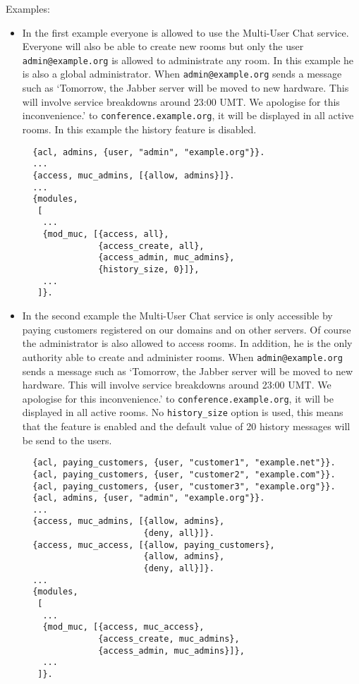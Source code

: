 \documentclass[a4paper,10pt]{book}
\newcommand{\jid}[1]{\texttt{#1}}
\newcommand{\term}[1]{\texttt{#1}}
\newcommand{\Jabber}{Jabber}
\begin{document}
Examples:
\begin{itemize}
\item In the first example everyone is allowed to use the Multi-User Chat
  service. Everyone will also be able to create new rooms but only the user
  \jid{admin@example.org} is allowed to administrate any room. In this
  example he is also a global administrator. When \jid{admin@example.org}
  sends a message such as `Tomorrow, the \Jabber{} server will be moved
  to new hardware. This will involve service breakdowns around 23:00 UMT.
  We apologise for this inconvenience.' to \jid{conference.example.org},
  it will be displayed in all active rooms. In this example the history
  feature is disabled.
  \begin{verbatim}
  {acl, admins, {user, "admin", "example.org"}}.
  ...
  {access, muc_admins, [{allow, admins}]}.
  ...
  {modules,
   [
    ...
    {mod_muc, [{access, all},
               {access_create, all},
               {access_admin, muc_admins},
               {history_size, 0}]},
    ...
   ]}.
\end{verbatim}
\item In the second example the Multi-User Chat service is only accessible by
  paying customers registered on our domains and on other servers. Of course
  the administrator is also allowed to access rooms. In addition, he is the
  only authority able to create and administer rooms. When
  \jid{admin@example.org} sends a message such as `Tomorrow, the \Jabber{}
  server will be moved to new hardware. This will involve service breakdowns
  around 23:00 UMT. We apologise for this inconvenience.' to
  \jid{conference.example.org}, it will be displayed in all active rooms. No
  \term{history\_size} option is used, this means that the feature is enabled
  and the default value of 20 history messages will be send to the users.
  \begin{verbatim}
  {acl, paying_customers, {user, "customer1", "example.net"}}.
  {acl, paying_customers, {user, "customer2", "example.com"}}.
  {acl, paying_customers, {user, "customer3", "example.org"}}.
  {acl, admins, {user, "admin", "example.org"}}.
  ...
  {access, muc_admins, [{allow, admins},
                        {deny, all}]}.
  {access, muc_access, [{allow, paying_customers},
                        {allow, admins},
                        {deny, all}]}.
  ...
  {modules,
   [
    ...
    {mod_muc, [{access, muc_access},
               {access_create, muc_admins},
               {access_admin, muc_admins}]},
    ...
   ]}.
\end{verbatim}


\end{itemize}
\end{document}
